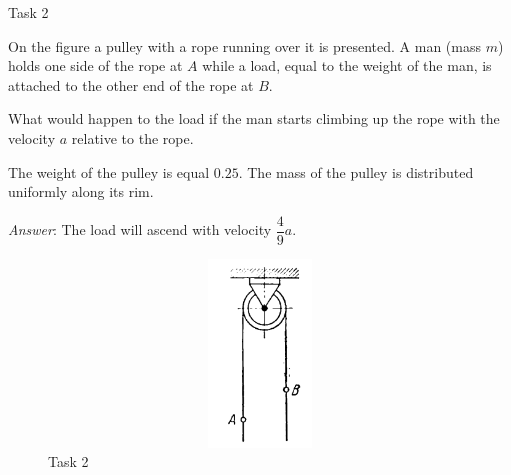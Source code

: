 \documentclass[aspectratio=169]{beamer}
\newcommand{\fbckg}[1]{\usebackgroundtemplate{\texttt{[image: \#1]}}}%
\begin{document}
\begin{frame}[t]{Task 2}
  \begin{minipage}{0.6\textwidth}
    On the figure a pulley with a rope running over it is presented. A man (mass $m$) holds one side of the rope at $A$ while a load, equal to the weight of the man, is attached to the other end of the rope at $B$.
    
    What would happen to the load if the man starts climbing up the rope with the velocity $a$ relative to the rope.

    The weight of the pulley is equal $0.25$. The mass of the pulley is distributed uniformly along its rim. \smallskip

    \textit{Answer}: The load will ascend with velocity $\dfrac{4}{9}a$.
  \end{minipage}
  \begin{minipage}{0.39\textwidth}
    \begin{figure}[H]
      \centering\includegraphics[height=5cm,width=1\textwidth,keepaspectratio]{HW6_1}
      \caption*{Task 2}
    \end{figure}
  \end{minipage}
\end{frame}

\fbckg{fibeamer/figs/last_page.png}
\frame[plain]{}
\end{document}

